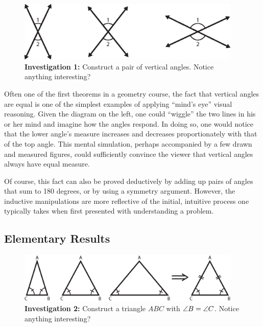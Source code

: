 \begin{figure}[h!]
\centering
\includegraphics[width=0.95\textwidth]{diagrams/vertical.eps}
\captionsetup{labelformat=empty}
\caption{{\bf Investigation 1:} Construct a pair of vertical angles.
  Notice anything interesting?}
\end{figure}

Often one of the first theorems in a geometry course, the fact that
vertical angles are equal is one of the simplest examples of applying
``mind's eye'' visual reasoning.  Given the diagram on the left, one
could ``wiggle'' the two lines in his or her mind and imagine how the
angles respond.  In doing so, one would notice that the lower angle's
measure increases and decreases proportionately with that of the top
angle.  This mental simulation, perhaps accompanied by a few drawn and
measured figures, could sufficiently convince the viewer that vertical
angles always have equal measure.

Of course, this fact can also be proved deductively by adding up pairs
of angles that sum to 180 degrees, or by using a symmetry argument.
However, the inductive manipulations are more reflective of the
initial, intuitive process one typically takes when first presented
with understanding a problem.

\newpage
\subsection{Elementary Results}
\label{sec:elem}

\begin{figure}[h!]
\centering
\includegraphics[width=0.95\textwidth]{diagrams/isosceles-triangle.eps}
\captionsetup{labelformat=empty}
\caption{{\bf Investigation 2:} Construct a triangle $ABC$ with
$ \protect\angle B = \protect\angle C$. Notice anything interesting?}
\end{figure}

